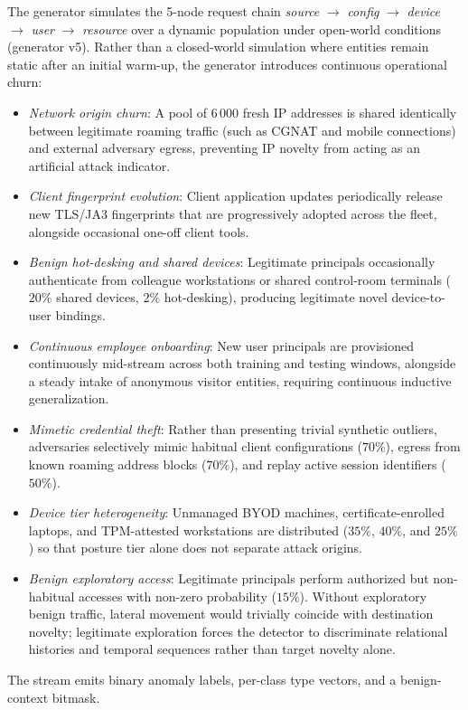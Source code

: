 The generator simulates the 5-node request chain \textit{source} $\rightarrow$ \textit{config}
$\rightarrow$ \textit{device} $\rightarrow$ \textit{user} $\rightarrow$ \textit{resource}
over a dynamic population under open-world conditions (generator v5). Rather than a closed-world
simulation where entities remain static after an initial warm-up, the generator introduces continuous
operational churn:
\begin{itemize}
  \item \textit{Network origin churn}: A pool of 6\,000 fresh IP addresses is shared identically
  between legitimate roaming traffic (such as CGNAT and mobile connections) and external adversary
  egress, preventing IP novelty from acting as an artificial attack indicator.
  \item \textit{Client fingerprint evolution}: Client application updates periodically release new
  TLS/JA3 fingerprints that are progressively adopted across the fleet, alongside occasional one-off
  client tools.
  \item \textit{Benign hot-desking and shared devices}: Legitimate principals occasionally authenticate
  from colleague workstations or shared control-room terminals ($20\%$ shared devices, $2\%$ hot-desking),
  producing legitimate novel device-to-user bindings.
  \item \textit{Continuous employee onboarding}: New user principals are provisioned continuously
  mid-stream across both training and testing windows, alongside a steady intake of anonymous visitor
  entities, requiring continuous inductive generalization.
  \item \textit{Mimetic credential theft}: Rather than presenting trivial synthetic outliers, adversaries
  selectively mimic habitual client configurations ($70\%$), egress from known roaming address blocks
  ($70\%$), and replay active session identifiers ($50\%$).
  \item \textit{Device tier heterogeneity}: Unmanaged BYOD machines, certificate-enrolled laptops,
  and TPM-attested workstations are distributed ($35\%$, $40\%$, and $25\%$) so that posture tier
  alone does not separate attack origins.
  \item \textit{Benign exploratory access}: Legitimate principals perform authorized but non-habitual
  accesses with non-zero probability ($15\%$). Without exploratory benign traffic, lateral movement
  would trivially coincide with destination novelty; legitimate exploration forces the detector to
  discriminate relational histories and temporal sequences rather than target novelty alone.
\end{itemize}
The stream emits binary anomaly labels, per-class type vectors, and a benign-context bitmask.

